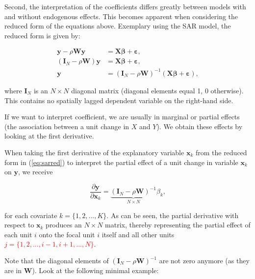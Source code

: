 \documentclass[
  letterpaper,
  DIV=11,
  numbers=noendperiod]{scrreprt}
\begin{document}
Second, the interpretation of the coefficients differs greatly between
models with and without endogenous effects. This becomes apparent when
considering the reduced form of the equations above. Exemplary using the
SAR model, the reduced form is given by:

\[
\begin{split}
{\boldsymbol{\mathbf{y}}}-\rho{\boldsymbol{\mathbf{W}}}{\boldsymbol{\mathbf{y}}} &={\boldsymbol{\mathbf{X}}}{\boldsymbol{\mathbf{\beta}}}+ {\boldsymbol{\mathbf{\varepsilon}}}, \nonumber \\
({\boldsymbol{\mathbf{I}}_N}-\rho {\boldsymbol{\mathbf{W}}}){\boldsymbol{\mathbf{y}}} &={\boldsymbol{\mathbf{X}}}{\boldsymbol{\mathbf{\beta}}}+ {\boldsymbol{\mathbf{\varepsilon}}}\nonumber, \\
{\boldsymbol{\mathbf{y}}} &=({\boldsymbol{\mathbf{I}}_N}-\rho {\boldsymbol{\mathbf{W}}})^{-1}({\boldsymbol{\mathbf{X}}}{\boldsymbol{\mathbf{\beta}}}+ {\boldsymbol{\mathbf{\varepsilon}}}),
\end{split}
\]

where \({\boldsymbol{\mathbf{I}}_N}\) is an \(N \times N\) diagonal
matrix (diagonal elements equal 1, 0 otherwise). This contains no
spatially lagged dependent variable on the right-hand side.

If we want to interpret coefficient, we are usually in marginal or
partial effects (the association between a unit change in \(X\) and
\(Y\)). We obtain these effects by looking at the first derivative.

When taking the first derivative of the explanatory variable
\({\boldsymbol{\mathbf{x}}}_k\) from the reduced form in
(\ref{eq:sarred}) to interpret the partial effect of a unit change in
variable \({\boldsymbol{\mathbf{x}}}_k\) on
\({\boldsymbol{\mathbf{y}}}\), we receive

\[
\frac{\partial {\boldsymbol{\mathbf{y}}}}{\partial {\boldsymbol{\mathbf{x}}}_k}=\underbrace{({\boldsymbol{\mathbf{I}}_N}-\rho {\boldsymbol{\mathbf{W}}})^{-1}}_{N \times N}\beta_k,
\]

for each covariate \(k=\{1,2,...,K\}\). As can be seen, the partial
derivative with respect to \({\boldsymbol{\mathbf{x}}}_k\) produces an
\(N \times N\) matrix, thereby representing the partial effect of each
unit \(i\) onto the focal unit \(i\) itself and all other units
\textcolor{red}{$j=\{1,2,...,i-1,i+1,...,N\}$}.

Note that the diagonal elements of
\(({\boldsymbol{\mathbf{I}}_N}-\rho {\boldsymbol{\mathbf{W}}})^{-1}\)
are not zero anymore (as they are in \(\boldsymbol{\mathbf{W}}\)). Look
at the following minimal example:
\end{document}
